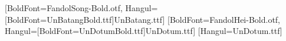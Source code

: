 [BoldFont=FandolSong-Bold.otf, Hangul={[BoldFont=UnBatangBold.ttf]UnBatang.ttf}]
[BoldFont=FandolHei-Bold.otf, Hangul={[BoldFont=UnDotumBold.ttf]UnDotum.ttf}]
[Hangul={UnDotum.ttf}]

